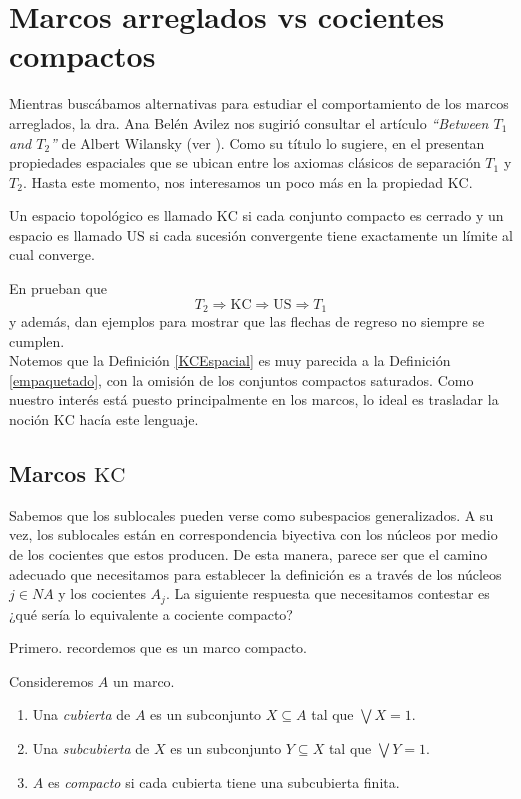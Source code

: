\chapter{Marcos arreglados vs cocientes compactos}\label{MarcosKC}

Mientras buscábamos alternativas para estudiar el comportamiento de los marcos arreglados, la dra. Ana Belén Avilez nos sugirió consultar el artículo \emph{``Between $T_1$ and $T_2$''} de Albert Wilansky (ver \cite{A.W.}). Como su título lo sugiere, en el presentan propiedades espaciales que se ubican 
entre los axiomas clásicos de separación $T_1$ y $T_2$. Hasta este momento, nos interesamos un poco más en la propiedad $\mathrm{KC}$. 

\begin{dfn}\label{KCEspacial}
Un espacio topológico es llamado $\mathrm{KC}$ si cada conjunto compacto es cerrado y un espacio es llamado $\mathrm{US}$ si cada sucesión convergente tiene exactamente un límite al cual converge.
\end{dfn}

En \cite{A.W.} prueban que 
\[
T_2\Rightarrow \mathrm{KC} \Rightarrow \mathrm{US} \Rightarrow T_1
\]
y además, dan ejemplos para mostrar que las flechas de regreso no siempre se cumplen.\\

Notemos que la Definición \ref{KCEspacial} es muy parecida a la Definición \ref{empaquetado}, con la omisión de los conjuntos compactos saturados. Como nuestro interés está puesto principalmente en los marcos, lo ideal es trasladar 
la noción $\mathrm{KC}$ hacía este lenguaje.

\section{Marcos $\mathrm{KC}$}\label{Marcoskc}
    
Sabemos que los sublocales pueden verse como subespacios generalizados. A su vez, los sublocales están en correspondencia biyectiva con los núcleos por medio de los cocientes que estos producen. De esta manera, parece ser que el 
camino adecuado que necesitamos para establecer la definición es a través de los núcleos $j\in NA$ y los cocientes $A_j$. La siguiente respuesta que necesitamos contestar es ¿qué sería lo equivalente a cociente compacto?

Primero. recordemos que es un marco compacto.

\begin{dfn}\label{marcocompacto}
Consideremos $A$ un marco. 
\begin{enumerate}
\item Una \emph{cubierta} de $A$ es un subconjunto $X\subseteq A$ tal que $\bigvee X=1$. 
\item Una \emph{subcubierta} de $X$ es un subconjunto $Y\subseteq X$ tal que $\bigvee Y=1$.
\item $A$ es \emph{compacto} si cada cubierta tiene una subcubierta finita.
\end{enumerate}
\end{dfn}

